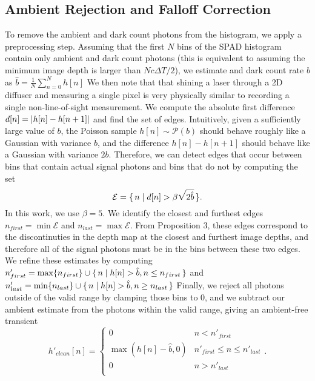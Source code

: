 \subsection{Ambient Rejection and Falloff Correction}
To remove the ambient and dark count photons from the histogram, we apply a
preprocessing step. Assuming that the first $N$ bins of the SPAD histogram
contain only ambient and dark count photons (this is equivalent to assuming the
minimum image depth is larger than $Nc\Delta T/2$), we estimate 
and dark count rate $b$ as $\hat b = \frac{1}{N}\sum_{n=0}^N h[n]$ We then
note that that shining a laser through a 2D diffuser and
measuring a single pixel is very physically similar to recording a single 
non-line-of-sight measurement. We
compute the absolute first difference $d[n] = \lvert h[n] - h[n+1]\rvert$ and find 
the set of edges. Intuitively, given a sufficiently large value of $b$, the Poisson sample
$h[n] \sim \mathcal{P}(b)$ should behave roughly like a Gaussian with variance $b$, and the difference
$h[n] - h[n+1]$ should behave like a Gaussian with variance $2b$. Therefore, we
can detect edges that occur between bins that contain actual signal photons and
bins that do not by computing the set 
\begin{equation}
  \mathcal{E} = \{\, n \mid d[n] > \beta\sqrt{2\hat b} \,\}.
  \label{eq:edge_set}
\end{equation}
In this work, we use $\beta = 5$.
We identify the closest and furthest edges $n_{first} = \min \mathcal{E}$ and
$n_{last} = \max \mathcal{E}$.
From \cite{Xin2019} Proposition 3, these edges
correspond to the discontinuties in the depth map 
at the closest and furthest image depths, and therefore all of the signal
photons must be in the bins between these two edges.
We refine these estimates by
computing $n'_{first} = \max\{n_{first}\}\cup\{\, n \mid h[n] > \hat b, n \leq n_{first} \,\}$ and
$n'_{last} = \min\{n_{last}\}\cup\{\, n \mid h[n] > \hat b, n \geq n_{last} \,\}$
Finally, we reject all photons outside of the valid range by clamping those bins
to 0, and we subtract our ambient estimate from the photons within the valid
range, giving an ambient-free transient
\begin{equation}
  h'_{clean}[n] = \begin{cases}
    0 & n < n'_{first} \\
    \max(h[n] - \hat b, 0) & n'_{first} \leq n \leq n'_{last} \\
    0 & n > n'_{last} \\
  \end{cases}.
  \label{eq:h_clean}
\end{equation}
